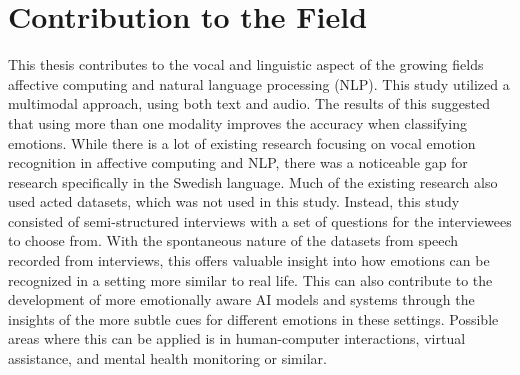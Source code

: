 \section{Contribution to the Field}
\label{sec:con-contribution}
This thesis contributes to the vocal and linguistic aspect of the growing fields affective computing and natural language processing (NLP).
This study utilized a multimodal approach, using both text and audio. The results of this suggested that using more than one modality improves the accuracy when classifying emotions.
While there is a lot of existing research focusing on vocal emotion recognition in affective computing and NLP, there was a noticeable gap for research specifically in the Swedish language. 
Much of the existing research also used acted datasets, which was not used in this study. Instead, this study consisted of semi-structured interviews with a set of questions for the interviewees to choose from. With the spontaneous nature of the datasets from speech recorded from interviews, this offers valuable insight into how emotions can be recognized in a setting more similar to real life. This can also contribute to the development of more emotionally aware AI models and systems through the insights of the more subtle cues for different emotions in these settings. Possible areas where this can be applied is in human-computer interactions, virtual assistance, and mental health monitoring or similar.
